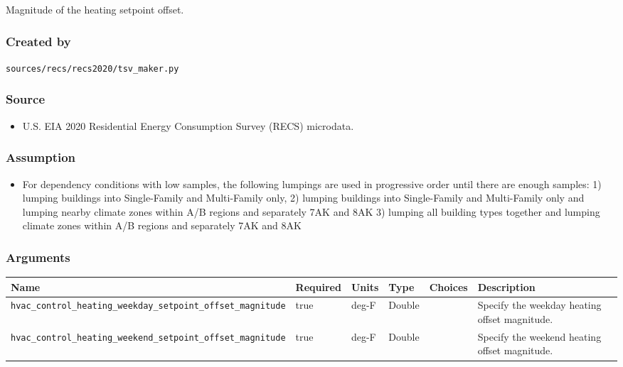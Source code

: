Magnitude of the heating setpoint offset.

\subsubsection{Created by}\label{created-by-89}

\texttt{sources/recs/recs2020/tsv\_maker.py}

\subsubsection{Source}\label{source-88}

\begin{itemize}
 
\item
  U.S. EIA 2020 Residential Energy Consumption Survey (RECS) microdata.
\end{itemize}

\subsubsection{Assumption}\label{assumption-53}

\begin{itemize}
 
\item
  For dependency conditions with low samples, the following lumpings are
  used in progressive order until there are enough samples: 1) lumping
  buildings into Single-Family and Multi-Family only, 2) lumping
  buildings into Single-Family and Multi-Family only and lumping nearby
  climate zones within A/B regions and separately 7AK and 8AK 3) lumping
  all building types together and lumping climate zones within A/B
  regions and separately 7AK and 8AK
\end{itemize}

\subsubsection{Arguments}\label{arguments-56}

\begin{longtable}[]{@{}llllll@{}}
\toprule\noalign{}
Name & Required & Units & Type & Choices & Description \\
\midrule\noalign{}
\endhead
\bottomrule\noalign{}
\endlastfoot
\texttt{hvac\_control\_heating\_weekday\_setpoint\_offset\_magnitude} &
true & deg-F & Double & & Specify the weekday heating offset
magnitude. \\
\texttt{hvac\_control\_heating\_weekend\_setpoint\_offset\_magnitude} &
true & deg-F & Double & & Specify the weekend heating offset
magnitude. \\
\end{longtable}

